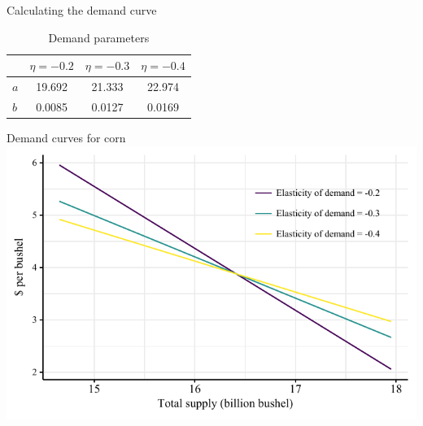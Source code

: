 \documentclass[table,xcolor=pdftex,dvipsnames, handout]{beamer}\usepackage[]{graphicx}\usepackage[]{color}
\makeatletter
\def\maxwidth{ %
  \ifdim\Gin@nat@width>\linewidth
    \linewidth
  \else
    \Gin@nat@width
  \fi
}
\newenvironment{knitrout}{}{} %
\makeatother
\begin{document}

\begin{frame}{Calculating the demand curve}
\begin{table}
\caption{Demand parameters}
\scriptsize
\begin{tabular}{l c c c}
  \toprule
   & $\eta=-0.2$ & $\eta = -0.3$ & $\eta=-0.4$ \\
   \midrule
   $a$ & 19.692 & 21.333 & 22.974 \\
   $b$ & 0.0085 & 0.0127 & 0.0169 \\
  \bottomrule
\end{tabular}
\end{table}
\end{frame}


\begin{frame}{Demand curves for corn}
\begin{knitrout}
\color{fgcolor}
\includegraphics[width=\maxwidth]{figure/figure_demand-1} 

\end{knitrout}
\end{frame}

\end{document}
